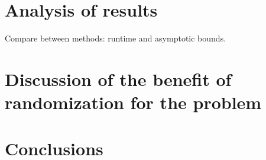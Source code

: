 \documentclass{acm_proc_article-sp}
\begin{document}

\section{Analysis of results}
Compare between methods: runtime and asymptotic bounds.

\section{Discussion of the benefit of randomization for the problem}

\section{Conclusions}



\balancecolumns
\end{document}
